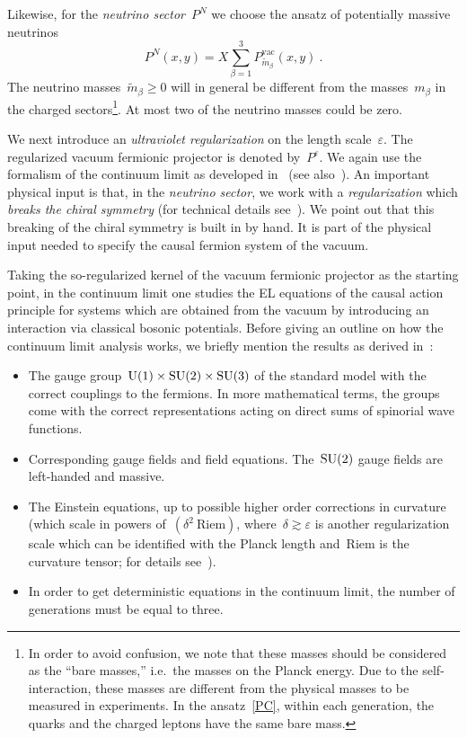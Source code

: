 \documentclass[reqno,11pt]{amsart}
\numberwithin{equation}{section}
\newcommand{\beq}{\begin{equation}}
\newcommand{\eeq}{\end{equation}}
\newcommand{\1}{\mbox{\rm 1 \hspace{-1.05 em} 1}}
\newcommand{\U}{{\rm{U}}}
\newcommand{\SU}{{\rm{SU}}}
\newcommand{\bitem}{\begin{itemize}[leftmargin=2em]}
\newcommand{\eitem}{\end{itemize}}
\newcommand{\itemD}{\item[{\raisebox{0.125em}{\tiny $\blacktriangleright$}}]}
\begin{document}
Likewise, for the {\em{neutrino sector}}~$P^N$ we choose the ansatz of potentially massive neutrinos
\beq \label{massneutrino}
P^N(x,y) = X \sum_{\beta=1}^3 P^\text{vac}_{\tilde{m}_\beta}(x,y) \:.
\eeq
The neutrino masses~$\tilde{m}_\beta \geq 0$ will in general be different from
the masses~$m_\beta$ in the charged sectors\footnote{In order to avoid confusion, we note that
these masses should be considered as the ``bare masses,'' i.e.\ the masses on the Planck energy.
Due to the self-interaction, these masses are different from the physical masses to be measured
in experiments. In the ansatz~\eqref{PC}, within each generation,
the quarks and the charged leptons have the same bare mass.}.
At most two of the neutrino masses could be zero.

We next introduce an {\em{ultraviolet regularization}} on the length scale~$\varepsilon$.
The regularized vacuum fermionic projector is denoted by~$P^\varepsilon$.
We again use the formalism of the continuum limit as developed in~\cite[Chapter~4]{pfp}
(see also~\cite[Section~3.5]{cfs}). An important physical input is that, in the {\em{neutrino sector}},
we work with a {\em{regularization}} which {\em{breaks the chiral symmetry}}
(for technical details see~\cite[\S4.2.5]{cfs}).
We point out that this breaking of the chiral symmetry is built in by hand.
It is part of the physical input needed to specify the causal fermion system of the vacuum.

Taking the so-regularized kernel of the vacuum fermionic projector as the starting point,
in the continuum limit one studies the EL equations of the causal action principle
for systems which are obtained from the vacuum by introducing an interaction via
classical bosonic potentials. Before giving an outline on how the continuum limit analysis works,
we briefly mention the results as derived in~\cite[Chapter~5]{cfs}:
\bitem
\itemD The gauge group~$\U(1) \times \SU(2) \times \SU(3)$ of the standard model
with the correct couplings to the fermions. In more mathematical terms, the groups come with the correct representations acting on direct sums of spinorial wave functions.
\itemD Corresponding gauge fields and field equations. The~$\SU(2)$ gauge fields are left-handed and massive.
\itemD The Einstein equations, up to possible higher order corrections in curvature (which scale in powers of~$(\delta^2\: \text{Riem})$, where~$\delta \gtrsim \varepsilon$ is another regularization scale which can be identified with the Planck length and~$\text{Riem}$ is the
curvature tensor; for details see~\cite[Theorems~4.9.3 and~5.4.4]{cfs}).
\itemD In order to get deterministic equations in the continuum limit,
the number of generations must be equal to three.
\eitem
\end{document}
